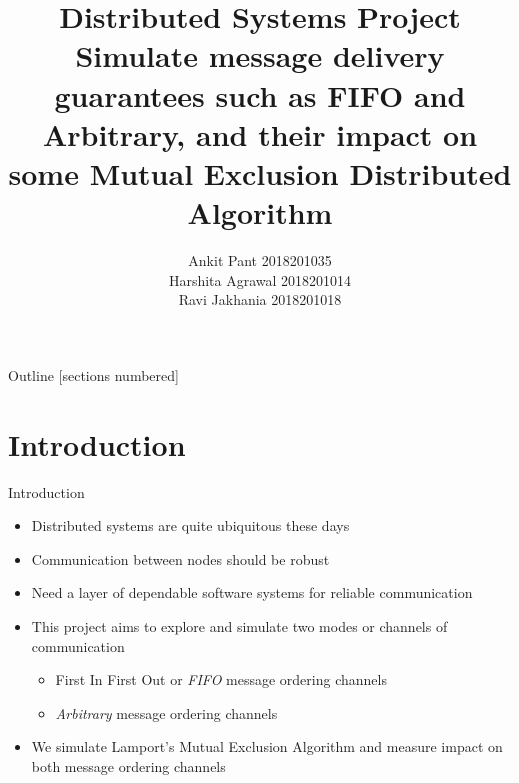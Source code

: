 \documentclass{beamer}
\title{\centering Distributed Systems Project\\ \vspace{2mm} \normalsize{Simulate message delivery guarantees such as FIFO and Arbitrary, and their impact on some Mutual Exclusion Distributed Algorithm  } \\ \vspace{-5mm}}
\author{Ankit Pant  2018201035 \\ 
		Harshita Agrawal 2018201014 \\
		Ravi Jakhania 2018201018 }
\date{}
\begin{document}
\begin{frame}[plain]
    \maketitle
\end{frame}
\begin{frame}{Outline}
	[sections numbered]
	\tableofcontents
\end{frame}

\section{Introduction}
	\begin{frame}{Introduction}
		\begin{itemize}
			\item Distributed systems are quite ubiquitous these days
			\item Communication between nodes should be robust
			\item  Need a layer of dependable software systems for reliable communication
			\item This project aims to explore and simulate two modes or channels of communication
			\begin{itemize}
				\item First In First Out or \emph{FIFO} message ordering channels
				\item \emph{Arbitrary} message ordering channels
			\end{itemize}
			\item We simulate Lamport's Mutual Exclusion Algorithm and measure impact on both message ordering channels
		\end{itemize}
	\end{frame}
\end{document}
